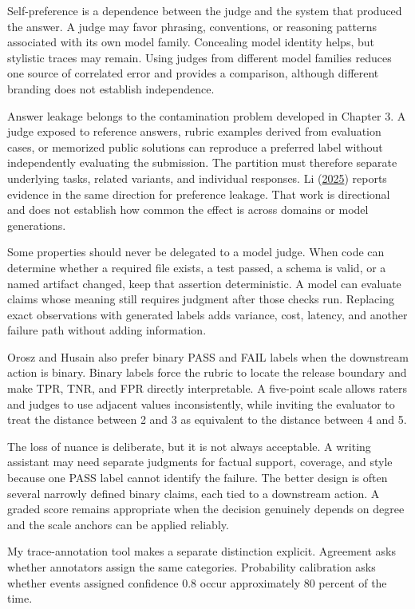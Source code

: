 Self-preference is a dependence between the judge and the system that produced the answer. A judge may favor phrasing, conventions, or reasoning patterns associated with its own model family. Concealing model identity helps, but stylistic traces may remain. Using judges from different model families reduces one source of correlated error and provides a comparison, although different branding does not establish independence.

Answer leakage belongs to the contamination problem developed in Chapter 3. A judge exposed to reference answers, rubric examples derived from evaluation cases, or memorized public solutions can reproduce a preferred label without independently evaluating the submission. The partition must therefore separate underlying tasks, related variants, and individual responses. Li (\href{https://arxiv.org/abs/2502.01534}{2025}) reports evidence in the same direction for preference leakage. That work is directional and does not establish how common the effect is across domains or model generations.

Some properties should never be delegated to a model judge. When code can determine whether a required file exists, a test passed, a schema is valid, or a named artifact changed, keep that assertion deterministic. A model can evaluate claims whose meaning still requires judgment after those checks run. Replacing exact observations with generated labels adds variance, cost, latency, and another failure path without adding information.

Orosz and Husain also prefer binary PASS and FAIL labels when the downstream action is binary. Binary labels force the rubric to locate the release boundary and make TPR, TNR, and FPR directly interpretable. A five-point scale allows raters and judges to use adjacent values inconsistently, while inviting the evaluator to treat the distance between 2 and 3 as equivalent to the distance between 4 and 5.

The loss of nuance is deliberate, but it is not always acceptable. A writing assistant may need separate judgments for factual support, coverage, and style because one PASS label cannot identify the failure. The better design is often several narrowly defined binary claims, each tied to a downstream action. A graded score remains appropriate when the decision genuinely depends on degree and the scale anchors can be applied reliably.

My trace-annotation tool makes a separate distinction explicit. Agreement asks whether annotators assign the same categories. Probability calibration asks whether events assigned confidence 0.8 occur approximately 80 percent of the time.

